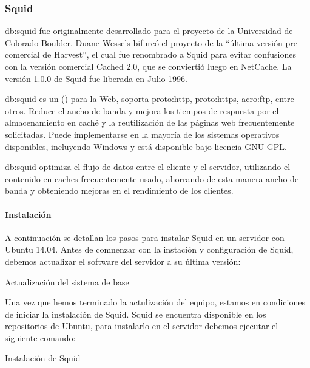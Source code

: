 \subsubsection{Squid}
\label{soa:tecnologias:squid}

\gls{db:squid} fue originalmente desarrollado para el proyecto  de la Universidad de Colorado Boulder.  Duane Wessels bifurcó el proyecto de la ``última versión pre-comercial de Harvest'', el cual fue renombrado a Squid para evitar confusiones con la versión comercial Cached 2.0, que se conviertió luego en NetCache.  La versión 1.0.0 de Squid fue liberada en Julio 1996.

\gls{db:squid} es un  () para la Web, soporta \gls{proto:http}, \gls{proto:https}, \gls{acro:ftp}, entre otros. Reduce el ancho de banda y mejora los tiempos de respuesta por el almacenamiento en caché y la reutilización de las páginas web frecuentemente solicitadas.  Puede implementarse en la mayoría de los sistemas operativos disponibles, incluyendo Windows y está disponible bajo licencia GNU GPL.

\gls{db:squid} optimiza el flujo de datos entre el cliente y el servidor, utilizando el contenido en caches frecuentemente usado, ahorrando de esta manera ancho de banda y obteniendo mejoras en el rendimiento de los clientes.

\paragraph{Instalación}

A continuación se detallan los pasos para instalar Squid en un servidor con Ubuntu 14.04.  Antes de comnenzar con la instación y configuración de Squid, debemos actualizar el software del servidor a su última versión:

\begin{listing}[H]
  \caption{Actualización del sistema de base}
  \label{soa:tecnologias:squid-cache:bash-preparacion}
\end{listing}

Una vez que hemos terminado la actulización del equipo, estamos en condiciones de iniciar la instalación de Squid.  Squid se encuentra disponible en los repositorios de Ubuntu, para instalarlo en el servidor debemos ejecutar el siguiente comando:

\begin{listing}[H]
  \caption{Instalación de Squid}
  \label{soa:tecnologias:squid-cache01:bash-preparacion}
\end{listing}

